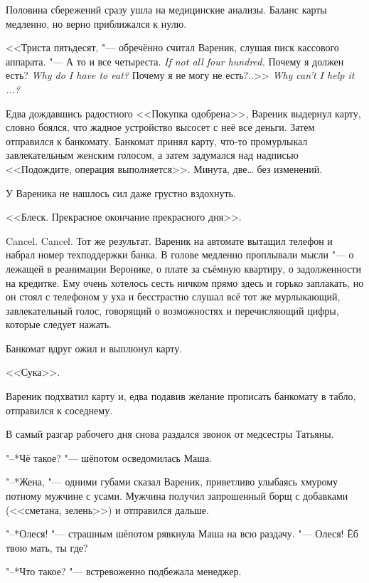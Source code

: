 Половина сбережений сразу ушла на медицинские анализы.
Баланс карты медленно, но верно приближался к нулю.

<<Триста пятьдесят, "--- обречённо считал Вареник, слушая писк кассового аппарата.
{"--- А то и все четыреста.}
{\textit{If not all four hundred.}}
{Почему я должен есть?}
{\textit{Why do I have to eat?}}
{Почему я не могу не есть?..>>}
{\textit{Why can't I help it ...?}}

Едва дождавшись радостного <<Покупка одобрена>>, Вареник выдернул карту, словно боялся, что жадное устройство высосет с неё все деньги.
Затем отправился к банкомату.
Банкомат принял карту, что-то промурлыкал завлекательным женским голосом, а затем задумался над надписью <<Подождите, операция выполняется>>.
Минута, две\dots{} без изменений.

У Вареника не нашлось сил даже грустно вздохнуть.

<<Блеск.
Прекрасное окончание прекрасного дня>>.

Cancel.
Cancel.
Тот же результат.
Вареник на автомате вытащил телефон и набрал номер техподдержки банка.
В голове медленно проплывали мысли "--- о лежащей в реанимации Веронике, о плате за съёмную квартиру, о задолженности на кредитке.
Ему очень хотелось сесть ничком прямо здесь и горько заплакать, но он стоял с телефоном у уха и бесстрастно слушал всё тот же мурлыкающий, завлекательный голос, говорящий о возможностях и перечисляющий цифры, которые следует нажать.

Банкомат вдруг ожил и выплюнул карту.

<<Сука>>.

Вареник подхватил карту и, едва подавив желание прописать банкомату в табло, отправился к соседнему.

\asterism

\textspace

\label{Thu_2012_06_14}

В самый разгар рабочего дня снова раздался звонок от медсестры Татьяны.

"--*Чё такое? "--- шёпотом осведомилась Маша.

"--*Жена, "--- одними губами сказал Вареник, приветливо улыбаясь хмурому потному мужчине с усами.
Мужчина получил запрошенный борщ с добавками (<<сметана, зелень>>) и отправился дальше.

"--*Олеся! "--- страшным шёпотом рявкнула Маша на всю раздачу.
"--- Олеся!
Ёб твою мать, ты где?

"--*Что такое? "--- встревоженно подбежала менеджер.

